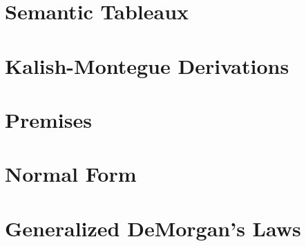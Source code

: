 \documentclass[a4paper,12pt]{article}
\begin{document}
\section{Semantic Tableaux}

\section{Kalish-Montegue Derivations}

\section{Premises}

\section{Normal Form}

\section{Generalized DeMorgan's Laws}
\end{document}
